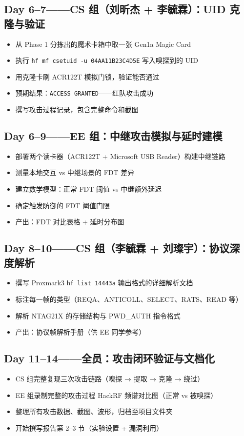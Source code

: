 \documentclass[12pt,a4paper]{ctexart}
\begin{document}
\subsection*{Day 6--7——CS 组（刘昕杰 + 李毓霖）：UID 克隆与验证}
\begin{itemize}[nosep]
    \item 从 Phase 1 分拣出的魔术卡箱中取一张 Gen1a Magic Card
    \item 执行 \texttt{hf mf csetuid -u 04AA11B23C4D5E} 写入嗅探到的 UID
    \item 用克隆卡刷 ACR122T 模拟门锁，验证能否通过
    \item 预期结果：\texttt{ACCESS GRANTED}——红队攻击成功
    \item 撰写攻击过程记录，包含完整命令和截图
\end{itemize}

\subsection*{Day 6--9——EE 组：中继攻击模拟与延时建模}
\begin{itemize}[nosep]
    \item 部署两个读卡器（ACR122T + Microsoft USB Reader）构建中继链路
    \item 测量本地交互 vs 中继场景的 FDT 差异
    \item 建立数学模型：正常 FDT 阈值 vs 中继额外延迟
    \item 确定触发防御的 FDT 阈值门限
    \item 产出：FDT 对比表格 + 延时分布图
\end{itemize}

\subsection*{Day 8--10——CS 组（李毓霖 + 刘璨宇）：协议深度解析}
\begin{itemize}[nosep]
    \item 撰写 Proxmark3 \texttt{hf list 14443a} 输出格式的详细解析文档
    \item 标注每一帧的类型（REQA、ANTICOLL、SELECT、RATS、READ 等）
    \item 解析 NTAG21X 的存储结构与 PWD\_AUTH 指令格式
    \item 产出：协议帧解析手册（供 EE 同学参考）
\end{itemize}

\subsection*{Day 11--14——全员：攻击闭环验证与文档化}
\begin{itemize}[nosep]
    \item CS 组完整复现三次攻击链路（嗅探 → 提取 → 克隆 → 绕过）
    \item EE 组录制完整的攻击过程 HackRF 频谱对比图（正常 vs 被嗅探）
    \item 整理所有攻击数据、截图、波形，归档至项目文件夹
    \item 开始撰写报告第 2--3 节（实验设置 + 漏洞利用）
\end{itemize}
\end{document}
